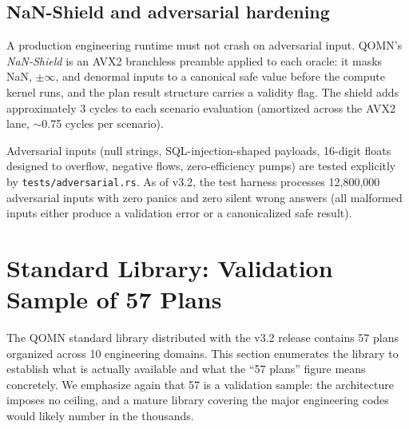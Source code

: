 \documentclass[11pt,a4paper]{article}
\begin{document}
\subsection{NaN-Shield and adversarial hardening}

A production engineering runtime must not crash on adversarial input. QOMN's \emph{NaN-Shield} is an AVX2 branchless preamble applied to each oracle: it masks NaN, $\pm\infty$, and denormal inputs to a canonical safe value before the compute kernel runs, and the plan result structure carries a validity flag. The shield adds approximately 3 cycles to each scenario evaluation (amortized across the AVX2 lane, $\sim$0.75 cycles per scenario).

Adversarial inputs (null strings, SQL-injection-shaped payloads, 16-digit floats designed to overflow, negative flows, zero-efficiency pumps) are tested explicitly by \texttt{tests/adversarial.rs}. As of v3.2, the test harness processes 12{,}800{,}000 adversarial inputs with zero panics and zero silent wrong answers (all malformed inputs either produce a validation error or a canonicalized safe result).

\section{Standard Library: Validation Sample of 57 Plans}
\label{sec:stdlib}

The QOMN standard library distributed with the v3.2 release contains 57 plans organized across 10 engineering domains. This section enumerates the library to establish what is actually available and what the ``57 plans'' figure means concretely. We emphasize again that 57 is a validation sample: the architecture imposes no ceiling, and a mature library covering the major engineering codes would likely number in the thousands.
\end{document}
